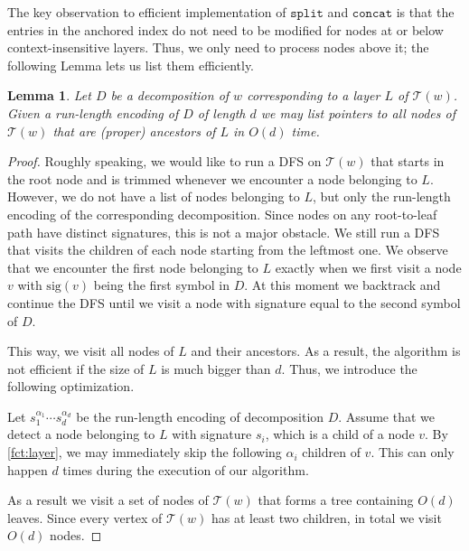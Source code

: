 \documentclass[a4paper]{article}
\newtheorem{lemma}[theorem]{Lemma}
\theoremstyle{remark}
\newcommand{\concop}{\mathtt{concat}}
\newcommand{\splitop}{\mathtt{split}}
\newcommand{\str}{w}
\newcommand{\decomp}{D}
\newcommand{\stree}{\mathcal{T}}
\newcommand{\ussig}{\mathrm{sig}}
\begin{document}
The key observation to efficient implementation of $\splitop$ and $\concop$
is that the entries in the anchored index do not need to be modified for nodes at or below context-insensitive layers.
Thus, we only need to process nodes above it; the following Lemma lets us list them efficiently.
\begin{lemma}\label{lem:list-above}
Let $\decomp$ be a decomposition of $\str$ corresponding to a layer $L$ of $\stree(\str)$.
Given a run-length encoding of $\decomp$ of length $d$ we may list pointers to all nodes of $\stree(\str)$ that are (proper) ancestors of $L$ in
$O(d)$ time.
\end{lemma}
\begin{proof}
Roughly speaking, we would like to run a DFS on $\stree(\str)$ that starts in the root node and is trimmed whenever we encounter a node belonging to $L$.
However, we do not have a list of nodes belonging to $L$, but only the run-length encoding of the corresponding decomposition.
Since nodes on any root-to-leaf path have distinct signatures, this is not a major obstacle.
We still run a DFS that visits the children of each node starting from the leftmost one.
We observe that we encounter the first node belonging to $L$ exactly when we first visit a node $v$ with $\ussig(v)$ being the first symbol in $\decomp$. At this moment we backtrack and continue the DFS until we visit a node with signature equal to the second symbol of $\decomp$.

This way, we visit all nodes of $L$ and their ancestors.
As a result, the algorithm is not efficient if the size of $L$ is much bigger than $d$.
Thus, we introduce the following optimization.

Let $s_1^{\alpha_1}\cdots s_d^{\alpha_d}$ be the run-length encoding of decomposition $\decomp$.
Assume that we detect a node belonging to $L$ with signature $s_i$, which is a child of a node $v$.
By \cref{fct:layer}, we may immediately skip the following $\alpha_i$ children of $v$.
This can only happen $d$ times during the execution of our algorithm.

As a result we visit a set of nodes of $\stree(\str)$ that forms a tree containing $O(d)$ leaves.
Since every vertex of $\stree(\str)$ has at least two children, in total we visit $O(d)$ nodes.
\end{proof}
\end{document}
